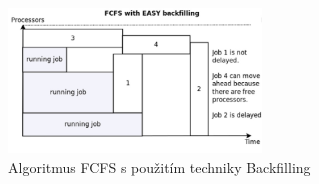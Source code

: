 \begin{figure}
	\centering
	\includegraphics[width=0.6\textwidth]{Figures/fcfs-with-backfilling.png}
	\caption{Algoritmus FCFS s použitím techniky Backfilling \cite{GomezMartin2016}}
	\label{fig:fcfs-with-backfilling}
\end{figure}
